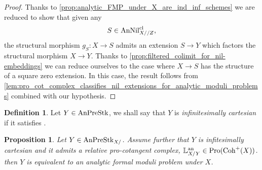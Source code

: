 \documentclass[10pt,a4paper,reqno]{amsart} %
\theoremstyle{plain}
\newtheorem{prop}[thm]{Proposition}
\theoremstyle{definition}
\newtheorem{defin}[thm]{Definition}
\theoremstyle{remark}
\numberwithin{equation}{section}
\begin{document}
\begin{proof}
    Thanks to \cref{prop:analytic_FMP_under_X_are_ind_inf_schemes} we are reduced to show that given any
        \[
            S \in \mathrm{AnNil}_{X//Z}^{\mathrm{cl}},  
        \]
    the structural morphism $g_S \colon X \to S$ admits an extension $S \to Y$ which factors the structural morphism $X \to Y$. Thanks to
    \cref{prop:filtered_colimit_for_nil-embeddings} we can reduce ourselves to the case where $X \to S$ has the structure of
    a square zero extension. In this case, the result follows from \cref{lem:pro_cot_complex_classifies_nil_extensions_for_analytic_moduli_problems}
    combined with our hypothesis.
\end{proof}

\begin{defin}
    Let $Y \in \mathrm{AnPreStk}$, we shall say that $Y$ is \emph{infinitesimally cartesian} if it satisfies \cite[Definition 7.3]{Porta_Yu_Representability}.
\end{defin}

\begin{prop} \label{prop:sufficient_conditions_for_a_prestack_to_be_equiv_to_an_analytic_FMP}
    Let $Y \in \mathrm{AnPreStk}_{X/}$. Assume further that $Y$ is infitesimally cartesian and it admits a relative pro-cotangent complex, $\mathbb L_{X/Y}^\mathrm{an} \in \mathrm{Pro}(\mathrm{Coh}^+(X))$.
    then $Y$ is equivalent to an analytic formal moduli problem under $X$.
\end{prop}
\end{document}

